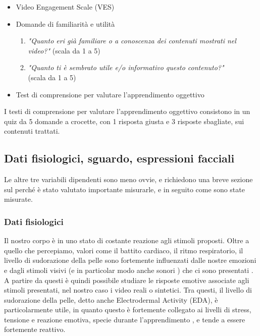 \begin{itemize}
\begin{enumerate}
            \item \textit{"Quanto il presentatore ti è sembrato naturale e realistico nella presentazione dei contenuti?"} (scala da 1 a 5)
        \end{enumerate}
    \item Video Engagement Scale (VES)
    \item Domande di familiarità e utilità
        \begin{enumerate}
            \item \textit{"Quanto eri già familiare o a conoscenza dei contenuti mostrati nel video?"} (scala da 1 a 5)
            \item \textit{"Quanto ti è sembrato utile e/o informativo questo contenuto?"} \\ (scala da 1 a 5)
        \end{enumerate}
    \item Test di comprensione per valutare l’apprendimento oggettivo
\end{itemize}

I testi di comprensione per valutare l'apprendimento oggettivo consistono in un quiz da 5 domande a crocette, con 1 risposta giusta e 3 risposte sbagliate, sui contenuti trattati.

\subsection{Dati fisiologici, sguardo, espressioni facciali}

Le altre tre variabili dipendenti sono meno ovvie, e richiedono una breve sezione sul perché è stato valutato importante misurarle, e in seguito come sono state misurate.

\subsubsection{Dati fisiologici}

Il nostro corpo è in uno stato di costante reazione agli stimoli proposti. Oltre a quello che percepiamo, valori come il battito cardiaco, il ritmo respiratorio, il livello di sudorazione della pelle sono fortemente influenzati dalle nostre emozioni e dagli stimoli visivi (e in particolar modo anche sonori \cite{pitchforth2010auditorystimuli}) che ci sono presentati \cite{gunaratne2019visualstimuli}. A partire da questi è quindi possibile studiare le risposte emotive associate agli stimoli presentati, nel nostro caso i video reali o sintetici. Tra questi, il livello di sudorazione della pelle, detto anche Electrodermal Activity (EDA), è particolarmente utile, in quanto questo è fortemente collegato ai livelli di stress, tensione e reazione emotiva, specie durante l'apprendimento \cite{di2018electrodermal}\cite{tinga2020neurophysiology}, e tende a essere fortemente reattivo.

